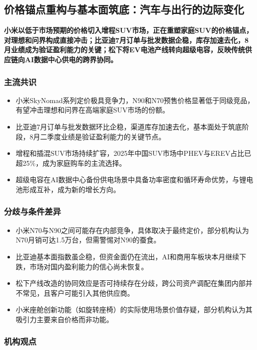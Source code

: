 \documentclass[11pt]{ctexart}
\begin{document}
\subsection{价格锚点重构与基本面筑底：汽车与出行的边际变化}
\textbf{小米以低于市场预期的价格切入增程SUV市场，正在重塑家庭SUV的价格锚点，对理想和问界构成直接冲击；比亚迪7月订单与批发数据企稳，库存加速去化，8月业绩成为验证盈利能力的关键；松下将EV电池产线转向超级电容，反映传统供应链向AI数据中心供电的跨界协同。}
\subsubsection*{主流共识}
\begin{itemize}
  \item 小米SkyNomad系列定价极具竞争力，N90和N70预售价格显著低于同级竞品，有望冲击理想和问界在高端家庭SUV市场的份额。
  \item 比亚迪7月订单与批发数据环比企稳，渠道库存加速去化，基本面处于筑底阶段，8月二季度业绩是验证盈利能力的关键节点。
  \item 增程和插混SUV市场持续扩容，2025年中国SUV市场中PHEV与EREV占比已超25\%，成为家庭购车的主流选择。
  \item 超级电容在AI数据中心备份供电场景中具备功率密度和循环寿命优势，与锂电池形成互补，成为新的增长方向。
\end{itemize}
\subsubsection*{分歧与条件差异}
\begin{itemize}
  \item 小米N70与N90之间可能存在内部竞争，具体取决于最终定价，部分机构认为N70月销可达1.5万台，但需警惕对N90的蚕食。
  \item 比亚迪基本面指数虽企稳，但资金面仍在流出，AI和商用车板块本月继续下跌，市场对国内盈利能力的信心尚未恢复。
  \item 松下产线改造的协同效应是否可持续存在分歧，跨公司资产调配在集团内部并不常见，且客户可能引入其他供应商。
  \item 小米座舱创新功能（如旋转座椅）的实际使用场景价值存疑，部分机构认为其吸引力主要来自价格而非功能。
\end{itemize}
\subsubsection*{机构观点}
\end{document}
